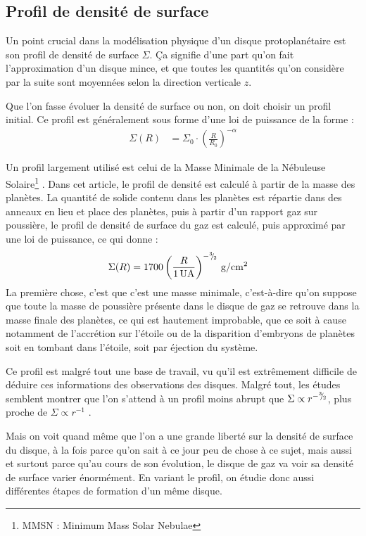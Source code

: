 \subsection{Profil de densité de surface}
Un point crucial dans la modélisation physique d'un disque protoplanétaire est son profil de densité de surface $\Sigma$. Ça signifie d'une part qu'on fait l'approximation d'un disque mince, et que toutes les quantités qu'on considère par la suite sont moyennées selon la direction verticale $z$.

Que l'on fasse évoluer la densité de surface ou non, on doit choisir un profil initial. Ce profil est généralement sous forme d'une loi de puissance de la forme : 
\begin{align}
\Sigma(R) &= \Sigma_0 \cdot \left(\frac{R}{R_0}\right)^{-\alpha}
\end{align}

Un profil largement utilisé est celui de la Masse Minimale de la Nébuleuse Solaire\footnote{MMSN : Minimum Mass Solar Nebulae} \citep{weidenschilling1977distribution, hayashi1981structure}. Dans cet article, le profil de densité est calculé à partir de la masse des planètes. La quantité de solide contenu dans les planètes est répartie dans des anneaux en lieu et place des planètes, puis à partir d'un rapport gaz sur poussière, le profil de densité de surface du gaz est calculé, puis approximé par une loi de puissance, ce qui donne : 
\begin{align}
\Sigma(R) &= 1700 \left(\frac{R}{1\mathrm{\thinspace UA}}\right)^{-{{}^{3\!\!}/ _{\!2}}} \mathrm{\thinspace g/cm^2}
\end{align}
La première chose, c'est que c'est une masse minimale, c'est-à-dire qu'on suppose que toute la masse de poussière présente dans le disque de gaz se retrouve dans la masse finale des planètes, ce qui est hautement improbable, que ce soit à cause notamment de l'accrétion sur l'étoile ou de la disparition d'embryons de planètes soit en tombant dans l'étoile, soit par éjection du système.

Ce profil est malgré tout une base de travail, vu qu'il est extrêmement difficile de déduire ces informations des observations des disques. Malgré tout, les études semblent montrer que l'on s'attend à un profil moins abrupt que $\Sigma\propto r^{-{{}^{3\!\!}/ _{\!2}}}$, plus proche de $\Sigma\propto r^{-1}$ \citep{bell1997structure}.

Mais on voit quand même que l'on a une grande liberté sur la densité de surface du disque, à la fois parce qu'on sait à ce jour peu de chose à ce sujet, mais aussi et surtout parce qu'au cours de son évolution, le disque de gaz va voir sa densité de surface varier énormément. En variant le profil, on étudie donc aussi différentes étapes de formation d'un même disque. 

